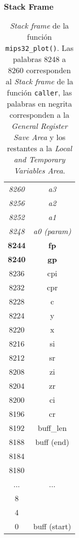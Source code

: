 \documentclass[10pt,a4paper]{article}
\begin{document}
\subsubsection{Stack Frame}
\begin{table}[H]
\centering
\begin{tabular}{c|c|}
\cline{2-2}
\textit{8260}  & \textit{a3}                \\ \cline{2-2}
\textit{8256}  & \textit{a2}                \\ \cline{2-2} 
\textit{8252}  & \textit{a1}                \\ \cline{2-2} 
\textit{8248}  & \textit{a0 (param)}                \\ \hline 
\textbf{8244}  & \textbf{fp}                \\ \cline{2-2} 
\textbf{8240}  & \textbf{gp}                \\ \cline{2-2} 
8236  & cpi                \\ \cline{2-2} 
8232  & cpr                \\ \cline{2-2}
8228  & c                \\ \cline{2-2} 
8224  & y                \\ \cline{2-2} 
8220  & x                \\ \cline{2-2} 
8216  & si                \\ \cline{2-2} 
8212  & sr                \\ \cline{2-2} 
8208  & zi                \\ \cline{2-2} 
8204  &  zr                \\ \cline{2-2} 
8200  &  ci                \\ \cline{2-2} 
8196  &  cr                \\ \cline{2-2}
8192  & buff\_len                \\ \cline{2-2}
8188  & buff (end)                 \\ 
8184  &                  \\ 
8180  &                  \\ 

  ... & ...             \\ 

8  &                  \\ 
4  &                  \\ 
0  & buff (start)                \\ \cline{2-2}
\end{tabular}
\caption{\textit{Stack frame} de la función \texttt{mips32\_plot()}. Las palabras 8248 a 8260 corresponden al \textit{Stack frame} de la función \texttt{caller}, las palabras en negrita corresponden a la \textit{General Register Save Area} y los restantes a la \textit{Local and Temporary Variables Area}.}
\end{table}
\end{document}
